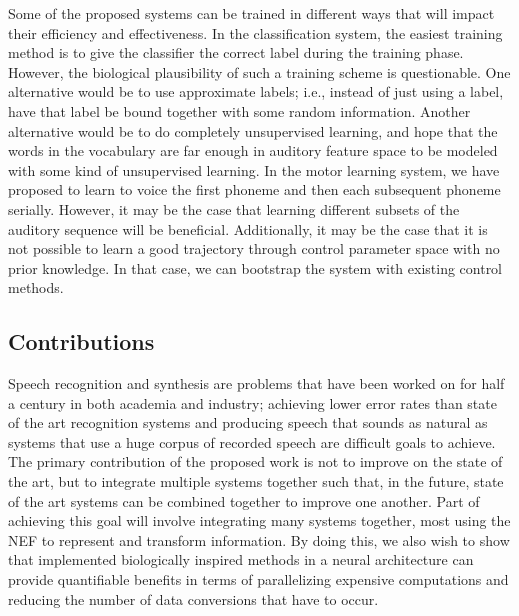 \documentclass{article}
\begin{document}
Some of the proposed systems
can be trained in different ways
that will impact their efficiency and effectiveness.
In the classification system,
the easiest training method
is to give the classifier
the correct label during the training phase.
However, the biological plausibility
of such a training scheme is questionable.
One alternative would be to
use approximate labels;
i.e., instead of just using a label,
have that label be bound together
with some random information.
Another alternative would be
to do completely unsupervised learning,
and hope that the words in the vocabulary
are far enough in auditory feature space
to be modeled with some kind of
unsupervised learning.
In the motor learning system,
we have proposed to learn to voice
the first phoneme and then each
subsequent phoneme serially.
However, it may be the case that
learning different subsets
of the auditory sequence
will be beneficial.
Additionally, it may be the case
that it is not possible
to learn a good trajectory
through control parameter space
with no prior knowledge.
In that case, we can bootstrap the system
with existing control methods.

\subsection{Contributions}
\label{subsec:contributions}

Speech recognition and synthesis
are problems that have been worked
on for half a century in both academia and industry;
achieving lower error rates
than state of the art recognition systems
and producing speech that sounds as natural
as systems that use a huge corpus
of recorded speech are
difficult goals to achieve.
The primary contribution of the proposed work
is not to improve on the state of the art,
but to integrate multiple systems together
such that, in the future,
state of the art systems
can be combined together
to improve one another.
Part of achieving this goal will involve
integrating many systems together,
most using the NEF to represent
and transform information.
By doing this, we also wish to show
that implemented biologically inspired methods
in a neural architecture
can provide quantifiable benefits
in terms of parallelizing expensive computations
and reducing the number of data conversions
that have to occur.
\end{document}
